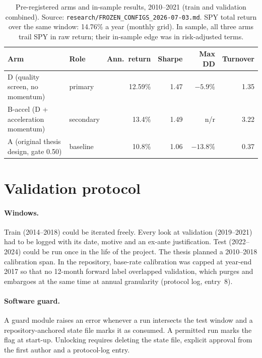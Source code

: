 \documentclass[11pt]{article}
\begin{document}
\begin{table}[t]
\centering
\caption{Pre-registered arms and in-sample results, 2010--2021 (train and validation combined). Source: \texttt{research/FROZEN\_CONFIGS\_2026-07-03.md}. SPY total return over the same window: 14.76\% a year (monthly grid). In sample, all three arms trail SPY in raw return; their in-sample edge was in risk-adjusted terms.}
\label{tab:arms}
\small
\begin{tabular}{llrrrr}
\toprule
Arm & Role & Ann.\ return & Sharpe & Max DD & Turnover \\
\midrule
D (quality screen, no momentum) & primary & 12.59\% & 1.47 & $-5.9\%$ & 1.35 \\
B-accel (D + acceleration momentum) & secondary & 13.4\% & 1.49 & n/r & 3.22 \\
A (original thesis design, gate 0.50) & baseline & 10.8\% & 1.06 & $-13.8\%$ & 0.37 \\
\bottomrule
\end{tabular}
\end{table}

\section{Validation protocol}\label{sec:protocol}

\paragraph{Windows.} Train (2014--2018) could be iterated freely. Every look at validation (2019--2021) had to be logged with its date, motive and an ex-ante justification. Test (2022--2024) could be run once in the life of the project. The thesis planned a 2010--2018 calibration span. In the repository, base-rate calibration was capped at year-end 2017 so that no 12-month forward label overlapped validation, which purges and embargoes at the same time at annual granularity (protocol log, entry~8).

\paragraph{Software guard.} A guard module raises an error whenever a run intersects the test window and a repository-anchored state file marks it as consumed. A permitted run marks the flag at start-up. Unlocking requires deleting the state file, explicit approval from the first author and a protocol-log entry.
\end{document}
